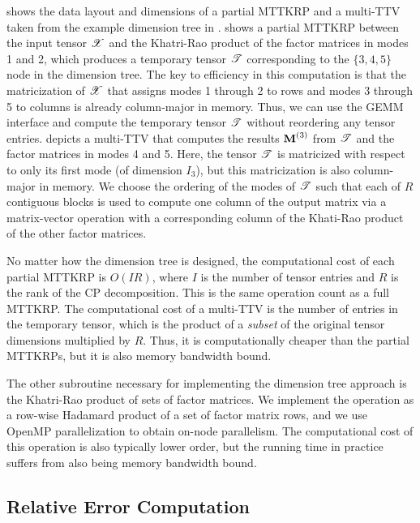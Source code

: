  shows the data layout and dimensions of a partial MTTKRP and a multi-TTV taken from the example dimension tree in .
 shows a partial MTTKRP between the input tensor $\T{X}$ and the Khatri-Rao product of the factor matrices in modes 1 and 2, which produces a temporary tensor $\T{T}$ corresponding to the $\{3,4,5\}$ node in the dimension tree.
The key to efficiency in this computation is that the matricization of $\T{X}$ that assigns modes 1 through 2 to rows and modes 3 through 5 to columns is already column-major in memory.
Thus, we can use the GEMM interface and compute the temporary tensor $\T{T}$ without reordering any tensor entries.
 depicts a multi-TTV that computes the results $\Mn{M}{3}$ from $\T{T}$ and the factor matrices in modes 4 and 5.
Here, the tensor $\T{T}$ is matricized with respect to only its first mode (of dimension $I_3$), but this matricization is also column-major in memory.
We choose the ordering of the modes of $\T{T}$ such that each of $R$ contiguous blocks is used to compute one column of the output matrix via a matrix-vector operation with a corresponding column of the Khati-Rao product of the other factor matrices.

No matter how the dimension tree is designed, the computational cost of each partial MTTKRP is $O(IR)$, where $I$ is the number of tensor entries and $R$ is the rank of the CP decomposition.
This is the same operation count as a full MTTKRP.
The computational cost of a multi-TTV is the number of entries in the temporary tensor, which is the product of a \emph{subset} of the original tensor dimensions multiplied by $R$.
Thus, it is computationally cheaper than the partial MTTKRPs, but it is also memory bandwidth bound.

The other subroutine necessary for implementing the dimension tree approach is the Khatri-Rao product of sets of factor matrices.
We implement the operation as a row-wise Hadamard product of a set of factor matrix rows, and we use OpenMP parallelization to obtain on-node parallelism.
The computational cost of this operation is also typically lower order, but the running time in practice suffers from also being memory bandwidth bound.



\subsection{Relative Error Computation}
\label{sec:error}

